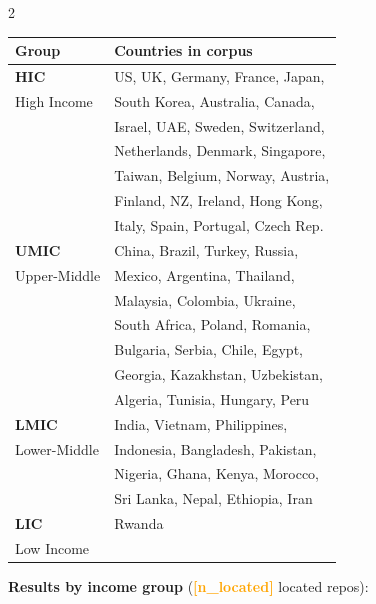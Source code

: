 \documentclass[10pt,a4paper]{article}
\newcommand{\FILLIN}[1]{\textcolor{orange}{\textbf{[#1]}}}
\begin{document}
\begin{multicols}{2}
\begin{tabular}{@{}ll@{}}
\toprule
Group & Countries in corpus \\
\midrule
\textbf{HIC} & US, UK, Germany, France, Japan, \\
High Income  & South Korea, Australia, Canada, \\
             & Israel, UAE, Sweden, Switzerland, \\
             & Netherlands, Denmark, Singapore, \\
             & Taiwan, Belgium, Norway, Austria, \\
             & Finland, NZ, Ireland, Hong Kong, \\
             & Italy, Spain, Portugal, Czech Rep. \\[4pt]
\textbf{UMIC} & China, Brazil, Turkey, Russia, \\
Upper-Middle  & Mexico, Argentina, Thailand, \\
              & Malaysia, Colombia, Ukraine, \\
              & South Africa, Poland, Romania, \\
              & Bulgaria, Serbia, Chile, Egypt, \\
              & Georgia, Kazakhstan, Uzbekistan, \\
              & Algeria, Tunisia, Hungary, Peru \\[4pt]
\textbf{LMIC} & India, Vietnam, Philippines, \\
Lower-Middle  & Indonesia, Bangladesh, Pakistan, \\
              & Nigeria, Ghana, Kenya, Morocco, \\
              & Sri Lanka, Nepal, Ethiopia, Iran \\[4pt]
\textbf{LIC}  & Rwanda \\
Low Income    & \\
\bottomrule
\end{tabular}

\end{multicols}

\vspace{6pt}
\textbf{Results by income group} (\FILLIN{n\_located} located repos):
\end{document}
